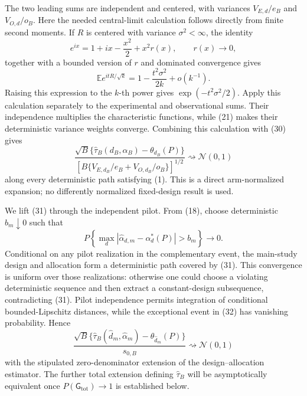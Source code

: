The two leading sums are independent and centered, with variances \(V_{E,d}/e_B\) and \(V_{O,d}/o_B\).  Here the needed central-limit calculation follows directly from finite second moments.  If \(R\) is centered with variance \(\sigma^2<\infty\), the identity
\[
e^{ix}=1+ix-\frac{x^2}{2}+x^2r(x),\qquad r(x)\longrightarrow0,
\]
together with a bounded version of \(r\) and dominated convergence gives
\[
\mathbb E e^{itR/\sqrt k}
=1-\frac{t^2\sigma^2}{2k}+o(k^{-1}).
\]
Raising this expression to the \(k\)-th power gives \(\exp(-t^2\sigma^2/2)\).  Apply this calculation separately to the experimental and observational sums.  Their independence multiplies the characteristic functions, while (21) makes their deterministic variance weights converge.  Combining this calculation with (30) gives
\[
\frac{\sqrt B\{\widehat\tau_B(d_B,\alpha_B)-\theta_{d_B}(P)\}}
{[B\{V_{E,d_B}/e_B+V_{O,d_B}/o_B\}]^{1/2}}
\rightsquigarrow\mathcal N(0,1)                                  \tag{31}
\]
along every deterministic path satisfying (1).  This is a direct arm-normalized expansion; no differently normalized fixed-design result is used.

We lift (31) through the independent pilot.  From (18), choose deterministic \(b_m\downarrow0\) such that
\[
P\left\{\max_d|\widehat\alpha_{d,m}-\alpha_d^*(P)|>b_m\right\}\to0.\tag{32}
\]
Conditional on any pilot realization in the complementary event, the main-study design and allocation form a deterministic path covered by (31).  This convergence is uniform over those realizations: otherwise one could choose a violating deterministic sequence and then extract a constant-design subsequence, contradicting (31).  Pilot independence permits integration of conditional bounded-Lipschitz distances, while the exceptional event in (32) has vanishing probability.  Hence
\[
\frac{\sqrt B\{\widehat\tau_B(\widehat d_m,\widehat\alpha_m)
-\theta_{\widehat d_m}(P)\}}{s_{0,B}}
\rightsquigarrow\mathcal N(0,1)                                  \tag{33}
\]
with the stipulated zero-denominator extension of the design--allocation estimator.  The further total extension defining \(\widehat\tau_B\) will be asymptotically equivalent once \(P(\mathsf G_{\mathrm{tot}})\to1\) is established below.

